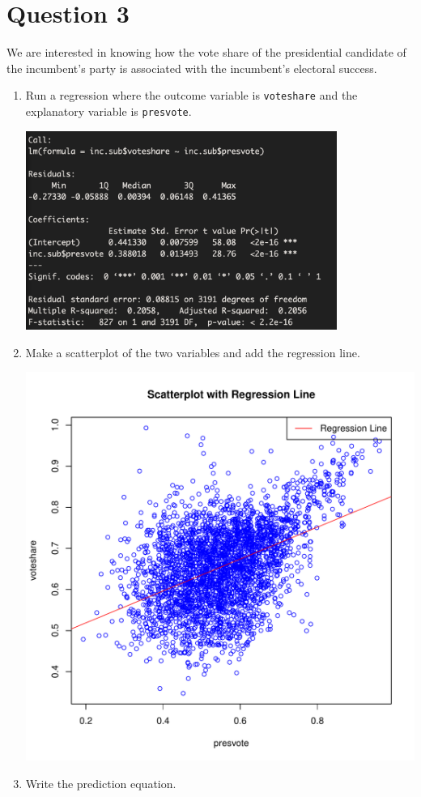 \documentclass[12pt,letterpaper]{article}
\begin{document}
	\newpage	
\section*{Question 3}

\noindent We are interested in knowing how the vote share of the presidential candidate of the incumbent's party is associated with the incumbent's electoral success.
	\vspace{.25cm}
	\begin{enumerate}
		\item Run a regression where the outcome variable is \texttt{voteshare} and the explanatory variable is \texttt{presvote}.
		 
		\includegraphics[width=0.8\textwidth]{q3.png}
			\vspace{5cm}
		\item Make a scatterplot of the two variables and add the regression line. 
		 
		\includegraphics[width=.85\textwidth]{lm_vote_pres.pdf}
			\vspace{5cm}
		\item Write the prediction equation.
		 
	\end{enumerate}
	
\end{document}
